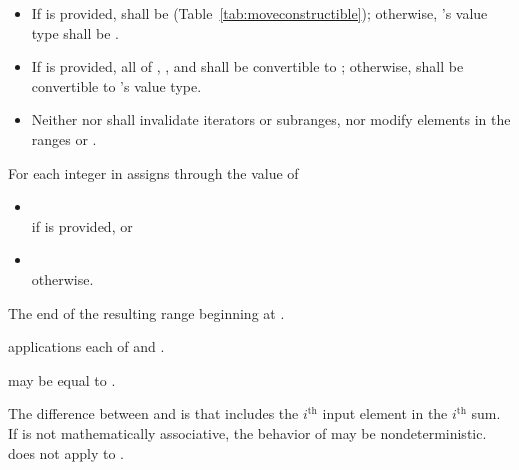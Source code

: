 \begin{itemdescr}
\pnum
\requires
\begin{itemize}
\item If  is provided,  shall be 
(Table~\ref{tab:moveconstructible}); otherwise, 's value
type shall be .

\item If  is provided, all of ,
, and
 shall be convertible to
; otherwise, 
shall be convertible to 's value type.

\item Neither  nor  shall invalidate iterators
or subranges, nor modify elements in the ranges  or
.
\end{itemize}

\pnum
\effects
For each integer  in 
assigns through  the value of
\begin{itemize}
\item
  \\
  if  is provided, or
\item
  \\
  otherwise.
\end{itemize}

\pnum
\returns
The end of the resulting range beginning at .

\pnum
\complexity
{} applications each of  and
.

\pnum
\remarks
{} may be equal to .

\pnum
\begin{note}
The difference between  and
 is that 
includes the $i^\text{th}$ input element in the $i^\text{th}$ sum. If  is not
mathematically associative, the behavior of 
may be nondeterministic.  does not apply
 to .
\end{note}
\end{itemdescr}

